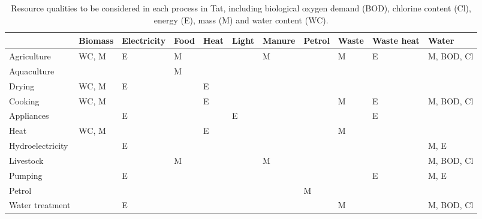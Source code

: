 \begin{sidewaystable}[h!]
	\centering
	\caption{Resource qualities to be considered in each process in Tat, including biological oxygen demand (BOD), chlorine content (Cl), energy (E), mass (M) and water content (WC).} \label{tab:quality_catalogue}
	\begin{tabular}{lllllllllll}
		\toprule
		& Biomass & Electricity & Food & Heat & Light & Manure & Petrol & Waste & Waste heat & Water \\
		\midrule
		Agriculture & WC, M & E & M & & & M & & M & E & M, BOD, Cl \\
		Aquaculture & & & M & & & & & & & \\
		Drying & WC, M & E &  & E & & & & & & \\
		Cooking & WC, M & & & E & & & & M & E & M, BOD, Cl \\
		Appliances & & E & & & E & & & & E & \\
		Heat & WC, M & & & E & & & & M & & \\
		Hydroelectricity & & E & & & & & & & & M, E \\
		Livestock & & & M & & & M & & & & M, BOD, Cl \\
		Pumping & & E & & & & & & & E & M, E \\
		Petrol & & & & & & & M & & & \\
		Water treatment & & E & & & & & & M & & M, BOD, Cl \\
		\bottomrule
	\end{tabular}
\end{sidewaystable}
